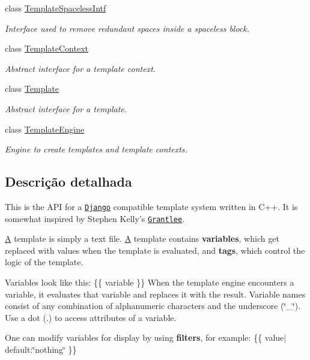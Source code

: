 \begin{DoxyCompactItemize}
class \hyperlink{class_template_spaceless_intf}{Template\-Spaceless\-Intf}
\begin{DoxyCompactList}\small\item\em Interface used to remove redundant spaces inside a spaceless block. \end{DoxyCompactList}\item 
class \hyperlink{class_template_context}{Template\-Context}
\begin{DoxyCompactList}\small\item\em Abstract interface for a template context. \end{DoxyCompactList}\item 
class \hyperlink{class_template}{Template}
\begin{DoxyCompactList}\small\item\em Abstract interface for a template. \end{DoxyCompactList}\item 
class \hyperlink{class_template_engine}{Template\-Engine}
\begin{DoxyCompactList}\small\item\em Engine to create templates and template contexts. \end{DoxyCompactList}\end{DoxyCompactItemize}


\subsection{Descrição detalhada}
This is the A\-P\-I for a \href{https://docs.djangoproject.com/en/1.6/topics/templates/}{\tt Django} compatible template system written in C++. It is somewhat inspired by Stephen Kelly's \href{http://www.gitorious.org/grantlee/pages/Home}{\tt Grantlee}.

\hyperlink{class_a}{A} template is simply a text file. \hyperlink{class_a}{A} template contains {\bfseries variables}, which get replaced with values when the template is evaluated, and {\bfseries tags}, which control the logic of the template.

Variables look like this\-: {\ttfamily \{\{ variable \}\}} When the template engine encounters a variable, it evaluates that variable and replaces it with the result. Variable names consist of any combination of alphanumeric characters and the underscore (\char`\"{}\-\_\-\char`\"{}). Use a dot (.) to access attributes of a variable.

One can modify variables for display by using {\bfseries filters}, for example\-: {\ttfamily \{\{ value$|$default\-:\char`\"{}nothing\char`\"{} \}\}}

